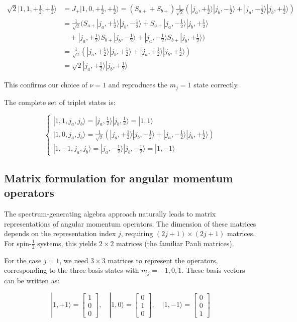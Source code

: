 \documentclass[italian]{HKNdocument}
\begin{document}
\begin{align}
\sqrt{2}|1,1,+\frac{1}{2},+\frac{1}{2}\rangle &= J_{+}|1,0,+\frac{1}{2},+\frac{1}{2}\rangle=(S_{a+}+S_{b+})\frac{1}{\sqrt{2}}(|j_a,+\frac{1}{2}\rangle|j_b,-\frac{1}{2}\rangle+|j_a,-\frac{1}{2}\rangle|j_b,+\frac{1}{2}\rangle) \\
&= \frac{1}{\sqrt{2}}(S_{a+}|j_a,+\frac{1}{2}\rangle|j_b,-\frac{1}{2}\rangle+S_{a+}|j_a,-\frac{1}{2}\rangle|j_b,+\frac{1}{2}\rangle \\
&\quad +|j_a,+\frac{1}{2}\rangle S_{b+}|j_b,-\frac{1}{2}\rangle+|j_a,-\frac{1}{2}\rangle S_{b+}|j_b,+\frac{1}{2}\rangle) \\
&= \frac{1}{\sqrt{2}}(|j_a,+\frac{1}{2}\rangle|j_b,+\frac{1}{2}\rangle+|j_a,+\frac{1}{2}\rangle|j_b,+\frac{1}{2}\rangle) \\
&= \sqrt{2}|j_a,+\frac{1}{2}\rangle|j_b,+\frac{1}{2}\rangle
\end{align}

This confirms our choice of $\nu=1$ and reproduces the $m_j=1$ state correctly.

The complete set of triplet states is:

\[
\left\{\begin{array}{l}
|1,1,j_a,j_b\rangle=|j_a,\frac{1}{2}\rangle|j_b,\frac{1}{2}\rangle=|1,1\rangle  \\
|1,0,j_a,j_b\rangle=\frac{1}{\sqrt{2}}(|j_a,+\frac{1}{2}\rangle|j_b,-\frac{1}{2}\rangle+|j_a,-\frac{1}{2}\rangle|j_b,+\frac{1}{2}\rangle) \\
|1,-1,j_a,j_b\rangle=|j_a,-\frac{1}{2}\rangle|j_b,-\frac{1}{2}\rangle=|1,-1\rangle
\end{array}\right.
\]


\subsection{Matrix formulation for angular momentum operators}
The spectrum-generating algebra approach naturally leads to matrix representations of angular momentum operators. The dimension of these matrices depends on the representation index $j$, requiring $(2j+1)\times(2j+1)$ matrices. For spin-$\frac{1}{2}$ systems, this yields $2\times2$ matrices (the familiar Pauli matrices).

For the case $j=1$, we need $3\times3$ matrices to represent the operators, corresponding to the three basis states with $m_j=-1,0,1$. These basis vectors can be written as:

\[
|1,+1\rangle=\left[\begin{array}{l}
1  \\
0 \\
0
\end{array}\right], \quad|1,0\rangle=\left[\begin{array}{l}
0 \\
1 \\
0
\end{array}\right], \quad|1,-1\rangle=\left[\begin{array}{l}
0 \\
0 \\
1
\end{array}\right]
\]
\end{document}
